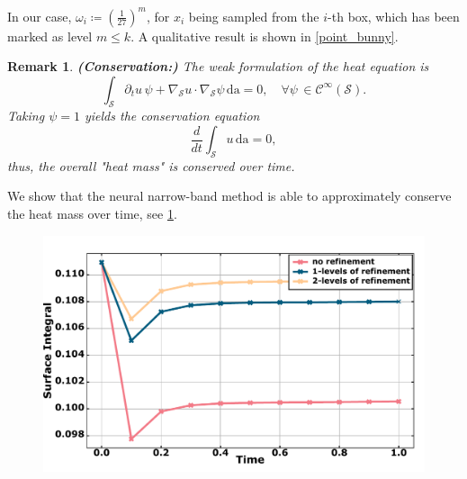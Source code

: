 \documentclass[12pt,openany]{book}
\def\S{\mathcal{S}}
\theoremstyle{plainnormal}
\newtheorem{remark}[theorem]{Remark}
\theoremstyle{remark}
\begin{document}
In our case, $\omega_i\coloneqq (\frac{1}{27})^m$, for $x_i$ being sampled from the $i$-th box, which has been marked as level $m\leq k$. A qualitative result is shown in \cref{point_bunny}.
\begin{remark}\textbf{(Conservation:)}
    The weak formulation of the heat equation is \[
        \int_\mathcal{S} \partial_t u \, \psi + \nabla_\mathcal{S} u \cdot \nabla_\mathcal{S} \psi \, \mathrm{da} = 0, \quad \forall \psi\,\in \mathcal C^\infty(\S).
    \]
    Taking $\psi = 1$ yields the conservation equation
    $$\frac{d}{dt} \int_\S  u \,\mathrm{da} = 0,$$
    thus, the overall "heat mass" is conserved over time.
\end{remark}
 We show that the neural narrow-band method is able to approximately conserve the heat mass over time, see \cref{mass_conservation}.
 \begin{figure}[htbp]
  \centering
  \begin{minipage}[l]{0.7\textwidth}
    \includegraphics[width=\linewidth]{Figures/heatflow_conservation}
  \end{minipage}%
  \hfill
  \begin{minipage}[r]{0.29\textwidth}
    \label{mass_conservation}
  \end{minipage}
\end{figure}
\FloatBarrier
\end{document}
